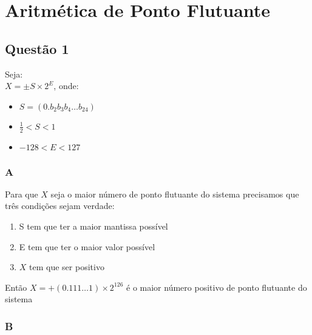 
\chapter{Aritmética de Ponto Flutuante}\label{partes:floatPointArit}


  \section{Questão 1}

  Seja: \\

  $X = \pm S \times 2^{E}$, onde:

  \begin{itemize}
  \item $S = (0.b_2 b_3 b_4 \dots b_24)$
  \item $\frac{1}{2} < S < 1$
  \item $-128 < E < 127$ 
  \end{itemize}
   
  \label{sec:question1}
  \subsection{A}

    Para que $X$ seja o maior número de ponto flutuante do sistema precisamos que três condições sejam verdade:

    \begin{enumerate}
    \item{S tem que ter a maior mantissa possível}
    \item{E tem que ter o maior valor possível}
    \item{$X$ tem que ser positivo}
    \end{enumerate}

    Então $X = +(0.111 \dots 1) \times 2^{126}$ é o maior número positivo de ponto flutuante do sistema

  \subsection{B}

